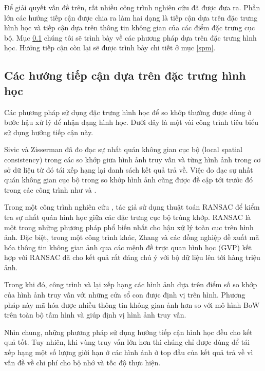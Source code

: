 Để giải quyết vấn đề trên, rất nhiều công trình nghiên cứu đã được đưa ra. Phần lớn các hướng tiếp cận được chia ra làm hai dạng là tiếp cận dựa trên đặc trưng hình học và tiếp cận dựa trên thông tin không gian của các điểm đặc trưng cục bộ. Mục \ref{geometry} chúng tôi sẽ trình bày về các phương pháp dựa trên đặc trưng hình học. Hướng tiếp cận còn lại sẽ được trình bày chi tiết ở mục \ref{spm}.

\subsection{Các hướng tiếp cận dựa trên đặc trưng hình học}
\label{geometry}
Các phương pháp sử dụng đặc trưng hình học để so khớp thường được dùng ở bước hậu xử lý để nhận dạng hình học. Dưới đây là một vài công trình tiêu biểu sử dụng hướng tiếp cận này.

Sivic và Zisserman \cite{sivic2003video} đã đo đạc sự nhất quán không gian cục bộ (local spatial consistency) trong các so khớp giữa hình ảnh truy vấn và từng hình ảnh trong cơ sở dữ liệu từ đó tái xếp hạng lại danh sách kết quả trả về. Việc đo đạc sự nhất quán không gian cục bộ trong so khớp hình ảnh cũng được đề cập tới trước đó trong các công trình như \cite{zhang1995robust} và \cite{schmid1997local}.

Trong một công trình nghiên cứu \cite{philbin2007object}, tác giả sử dụng thuật toán RANSAC \cite{fischler1981random} để kiểm tra sự nhất quán hình học giữa các đặc trưng cục bộ trùng khớp. RANSAC là một trong những phương pháp phổ biến nhất cho hậu xử lý toàn cục trên hình ảnh. Đặc biệt, trong một công trình khác, Zhang và các đồng nghiệp \cite{zhang2011image} đề xuất mã hóa thông tin không gian ảnh qua các mệnh đề trực quan hình học (GVP) kết hợp với RANSAC đã cho kết quả rất đáng chú ý với bộ dữ liệu lên tới hàng triệu ảnh.

Trong khi đó, công trình \cite{lin2010local} và \cite{lampert2009detecting} lại xếp hạng các hình ảnh dựa trên điểm số so khớp của hình ảnh truy vấn với những cửa sổ con được định vị trên hình. Phương pháp này mã hóa được nhiều thông tin không gian ảnh hơn so với mô hình BoW trên toàn bộ tấm hình và giúp định vị hình ảnh truy vấn.

Nhìn chung, những phương pháp sử dụng hướng tiếp cận hình học đều cho kết quả tốt. Tuy nhiên, khi vùng truy vấn lớn hơn thì chúng chỉ được dùng để tái xếp hạng một số lượng giới hạn ở các hình ảnh ở top đầu của kết quả trả về vì vấn đề về chi phí cho bộ nhớ và tốc độ thực hiện.

